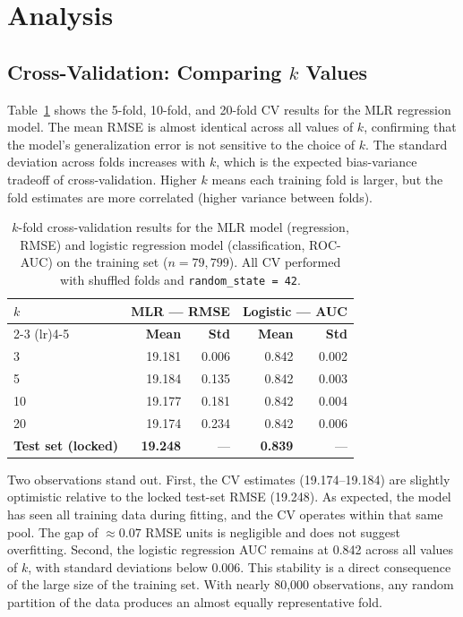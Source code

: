 \documentclass[12pt, oneside]{book}
\begin{document}
\section{Analysis}
 
\subsection{Cross-Validation: Comparing $k$ Values}
 
Table~\ref{tab:ch6_cv_rmse} shows the 5-fold, 10-fold, and 20-fold CV results for the MLR regression model. The mean RMSE is almost identical across all values of $k$, confirming that the model's generalization error is not sensitive to the choice of $k$. The standard deviation across folds increases with $k$, which is the expected bias-variance tradeoff of cross-validation. Higher $k$ means each training fold is larger, but the fold estimates are more correlated (higher variance between folds).
 
\begin{table}[H]
\centering
\caption{$k$-fold cross-validation results for the MLR model (regression, RMSE) and logistic regression model (classification, ROC-AUC) on the training set ($n = 79{,}799$). All CV performed with shuffled folds and \texttt{random\_state = 42}.}
\label{tab:ch6_cv_rmse}
\begin{tabular}{lrrrr}
\toprule
\multirow{2}{*}{\textbf{$k$}} & \multicolumn{2}{c}{\textbf{MLR --- RMSE}} & \multicolumn{2}{c}{\textbf{Logistic --- AUC}} \\
\cmidrule(lr){2-3} \cmidrule(lr){4-5}
& \textbf{Mean} & \textbf{Std} & \textbf{Mean} & \textbf{Std} \\
\midrule
3  & 19.181 & 0.006 & 0.842 & 0.002 \\
5  & 19.184 & 0.135 & 0.842 & 0.003 \\
10 & 19.177 & 0.181 & 0.842 & 0.004 \\
20 & 19.174 & 0.234 & 0.842 & 0.006 \\
\midrule
\textbf{Test set (locked)} & \textbf{19.248} & --- & \textbf{0.839} & --- \\
\bottomrule
\end{tabular}
\end{table}
 
Two observations stand out. First, the CV estimates (19.174--19.184) are slightly optimistic relative to the locked test-set RMSE (19.248). As expected, the model has seen all training data during fitting, and the CV operates within that same pool. The gap of $\approx 0.07$ RMSE units is negligible and does not suggest overfitting. Second, the logistic regression AUC remains at 0.842 across all values of $k$, with standard deviations below 0.006. This stability is a direct consequence of the large size of the training set. With nearly 80{,}000 observations, any random partition of the data produces an almost equally representative fold.
 
\end{document}
